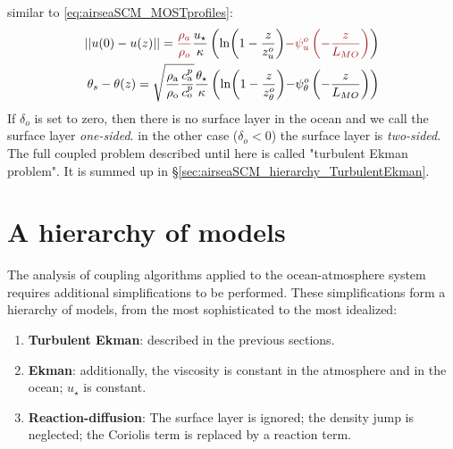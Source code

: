 similar to \eqref{eq:airseaSCM_MOSTprofiles}:
\begin{equation}
\label{eq:airseaSCM_MOSTprofilesOSL}
\begin{aligned}
	||u(0)-u(z)|| = \emphase{\frac{\rho_a}{\rho_o}}
	\frac{u_\star}{\kappa}
    \left(
	\ln(1-\frac{z}{z_{u}^o})
	\emphase{- \psi_u^o\left(-\frac{z}{L_{MO}}\right)}
    \right)
    \\
	\theta_s - \theta(z) = 
	{\sqrt{\frac{\rho_{\rm a}}{\rho_{\rm o}}
	\frac{c_{\rm a}^p}{c_{\rm o}^p}}}
	\frac{{\theta_\star}}{\kappa}
    \left(
	\ln(1-\frac{z}{z_{\theta}^o})
	{- \psi_\theta^o\left(-\frac{z}{L_{MO}}\right)}
\right)
\end{aligned}
\end{equation}
If $\delta_o$ is set to zero, then there is no surface layer
in the ocean and we call the surface layer \textit{one-sided}.
in the other case ($\delta_o<0$) the surface layer is
\textit{two-sided}.
The full coupled problem described until here
is called "turbulent Ekman problem". It is summed up in
\S\ref{sec:airseaSCM_hierarchy_TurbulentEkman}.
\section{A hierarchy of models}
\label{sec:airseaSCM_hierarchy}
The analysis of coupling algorithms applied to the
ocean-atmosphere system requires additional
simplifications to be performed.
These simplifications form a hierarchy of models, from
the most sophisticated to the most idealized:
\begin{enumerate}
	\item \textbf{Turbulent Ekman}: described in the previous
		sections.
	\item \textbf{Ekman}: additionally,
		the viscosity is constant in the
		atmosphere and in the ocean; $u_\star$ is constant.
	\item \textbf{Reaction-diffusion}: The surface layer is ignored;
		the density jump is neglected;
		the Coriolis term is replaced by a reaction term.
\end{enumerate}
